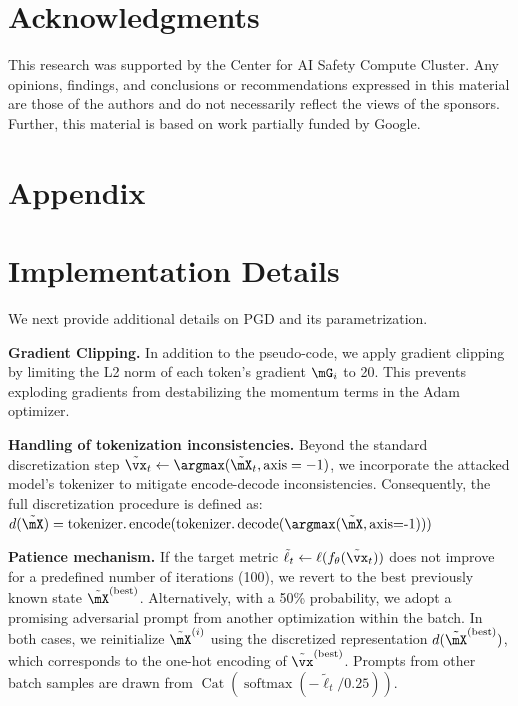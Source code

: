\documentclass{article}
\theoremstyle{plain}
\theoremstyle{definition}
\theoremstyle{remark}
\begin{document}
\section*{Acknowledgments}
This research was supported by the Center for AI Safety Compute Cluster. Any opinions, findings, and conclusions or recommendations expressed in this material are those of the authors and do not necessarily reflect the views of the sponsors. Further, this material is based on work partially funded by Google. 




\clearpage
\appendix
\onecolumn
\section*{Appendix}





\section{Implementation Details}\label{sec:appendix_details}

We next provide additional details on PGD and its parametrization.

\textbf{Gradient Clipping.} In addition to the pseudo-code, we apply gradient clipping by limiting the L2 norm of each token’s gradient \(\mG_i\) to 20. This prevents exploding gradients from destabilizing the momentum terms in the Adam optimizer.  

\textbf{Handling of tokenization inconsistencies.} Beyond the standard discretization step \(\tilde{\vx}_{t} \leftarrow \argmax(\tilde{\mX}_{t}, \text{axis}=-1)\), we incorporate the attacked model's tokenizer to mitigate encode-decode inconsistencies. Consequently, the full discretization procedure is defined as:  
\(
d(\tilde{\mX}) = \operatorname{tokenizer.encode}(\operatorname{tokenizer.decode}(\argmax(\tilde{\mX}, \text{axis=-1})))
\)

\textbf{Patience mechanism.} If the target metric \(\tilde{\ell}_{t} \leftarrow \ell(f_\theta(\tilde{\vx}_{t}))\) does not improve for a predefined number of iterations (100), we revert to the best previously known state \(\tilde{\mX}^{(\text{best})}\). Alternatively, with a 50\% probability, we adopt a promising adversarial prompt from another optimization within the batch. In both cases, we reinitialize \(\tilde{\mX}^{(i)}\) using the discretized representation \(d(\tilde{\mX}^{(\text{best})})\), which corresponds to the one-hot encoding of \(\tilde{\vx}^{(\text{best})}\). Prompts from other batch samples are drawn from \(\operatorname{Cat}(\operatorname{softmax}(-\tilde{\ell}_{t} / 0.25))\).  
\end{document}
